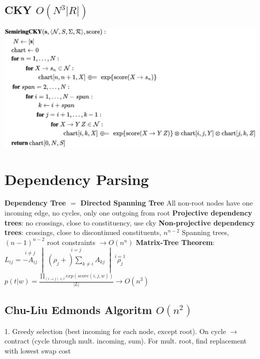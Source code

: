 \documentclass[a4paper, 11pt, landscape]{article}
\begin{document}
\begin{multicols*}{3}
\subsection{CKY $O(N^3|R|)$}
\includegraphics[scale=0.37]{cky}

\section{Dependency Parsing}
\textbf{Dependency Tree $=$ Directed Spanning Tree}\newline
All non-root nodes have one incoming edge, no cycles, only one outgoing from root\newline
\textbf{Projective dependency trees}: no crossings, close to constituency, use cky \newline
\textbf{Non-projective dependency trees}: crossings, close to discontinued constituents, $n^{n-2}$ Spanning trees, $(n-1)^{n-2}$ root constraints $\rightarrow O(n^n)$\newline
\textbf{Matrix-Tree Theorem}: 
$L_{ij}=\overset{{i\ne j}}{-A_{ij}}\;\;|\;\;
\overset{{i=j}}{(\rho_j+)\sum_{k\ne i} A_{kj}}\;\;|\;\;
\overset{{i=1}}{\rho_{j}}$\newline
$p(t|w)=\frac{\prod_{(i\rightarrow j)\in t}exp(score(i,j,w))}{|L|}\rightarrow O(n^3)$\newline
\subsection{Chu-Liu Edmonds Algoritm $O(n^2)$}
1. Greedy selection (best incoming for each node, except root). On cycle $\rightarrow$ contract (cycle through mult. incoming, sum). For mult. root, find replacement with lowest swap cost


\end{multicols*}
\end{document}
